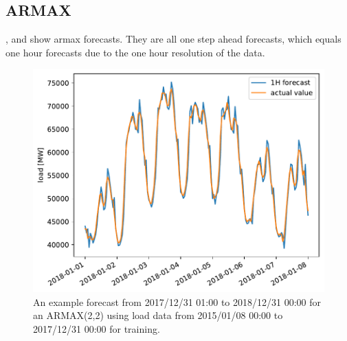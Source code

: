 \subsection*{ARMAX}

,  and  show \gls{armax} forecasts. They are all one step ahead forecasts, which equals one hour forecasts due to the one hour resolution of the data.\\

\begin{figure}[h!]%
\centering
\includegraphics[width=\textwidth]{plots/ARMAXfc/ARMAX_p2q2_data2015to2017_fcto2018123100_plot_range2018010100_2018010800}%
\caption{An example forecast from 2017/12/31 01:00 to 2018/12/31 00:00 for an ARMAX(2,2) using load data from 2015/01/08 00:00 to 2017/12/31 00:00 for training.}%
\label{fig:armax_fc}%
\end{figure}

